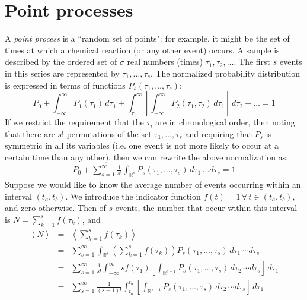 \documentclass{article}
\begin{document}
\section*{Point processes}
A \textit{point process} is a ``random set of points": for example, it might be the set of times at which a chemical reaction (or any other event) occurs. A sample is described by the ordered set of $\sigma$ real numbers (times) $\tau_1, \tau_2, \ldots$. The first $s$ events in this series are represented by $\tau_1,\ldots, \tau_s$. The normalized probability distribution is expressed in terms of functions $P_s(\tau_1,\ldots,\tau_s)$:
\[ P_0 + \int_{-\infty}^{\infty} P_1(\tau_1) \, d\tau_1 + \int_{\tau_1}^{\infty}\left[  \int_{-\infty}^{\infty}  P_2(\tau_1,\tau_2) \, d\tau_1 \right] \, d\tau_2 + \ldots = 1 \]
If we restrict the requirement that the $\tau_i$ are in chronological order, then noting that there are $s!$ permutations of the set ${\tau_1,\ldots,\tau_s}$ and requiring that $P_s$ is symmetric in all its variables (i.e. one event is not more likely to occur at a certain time than any other), then we can rewrite the above normalization as:
\begin{eqnarray}
P_0 + \sum_{s=1}^{\infty} \frac{1}{s!} \int_{\mathbb{R}^{s}} P_s(\tau_1,\ldots,\tau_s) \, d\tau_1 \, \ldots d\tau_s = 1 \label{eqn:normpoint}
\end{eqnarray}
Suppose we would like to know the average number of events occurring within an interval $(t_a,t_b)$. We introduce the indicator function $f(t)=1 \, \forall\,  t \in (t_a,t_b)$, and zero otherwise. Then of $s$ events, the number that occur within this interval is $N = \sum_{k=1}^s f(\tau_k)$, and
\begin{eqnarray*}
\left< N \right> & = & \left< \sum_{k=1}^{s} f(\tau_k) \right>\\
& = & \sum_{s=1}^{\infty} \int_{\mathbb{R}^{s}} \left( \sum_{k=1}^{s} f(\tau_k) \right) P_s(\tau_1,\ldots,\tau_s) \, d\tau_1 \, \cdots d\tau_s\\
& = & \sum_{s=1}^{\infty} \frac{1}{s!}  \int_{-\infty}^{\infty} s f(\tau_1) \left[  \int_{\mathbb{R}^{s-1}}  P_s(\tau_1,\ldots,\tau_s) \, d\tau_2 \, \cdots d\tau_s \right] \, d \tau_1\\
& = & \sum_{s=1}^{\infty} \frac{1}{(s-1)!}  \int_{t_a}^{t_b}  \left[  \int_{\mathbb{R}^{s-1}}  P_s(\tau_1,\ldots,\tau_s) \, d\tau_2 \, \cdots d\tau_s \right] \, d \tau_1\\
\end{eqnarray*}
\end{document}
